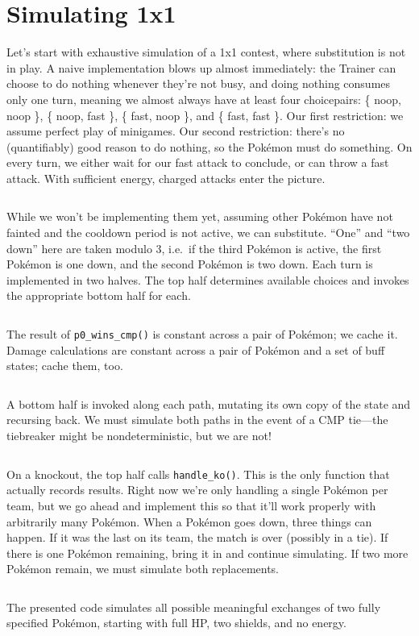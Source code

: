 \section{Simulating 1x1\label{sec:simul1x1}}
Let's start with exhaustive simulation of a 1x1 contest,
 where substitution is not in play.
A naive implementation blows up almost immediately: the Trainer can choose to do nothing
 whenever they're not busy, and doing nothing consumes only one turn,
 meaning we almost always have at least four choicepairs:
 \{ noop, noop \}, \{ noop, fast \}, \{ fast, noop \}, and \{ fast, fast \}.
Our first restriction: we assume perfect play of minigames.
Our second restriction: there's no (quantifiably) good reason to do nothing,
 so the Pokémon must do something.
On every turn, we either wait for our fast attack to conclude, or can throw a fast attack.
With sufficient energy, charged attacks enter the picture.
\inputminted{cpp}{s/sift.h}
While we won't be implementing them yet, assuming other Pokémon have not
  fainted and the cooldown period is not active, we can substitute.
``One'' and ``two down'' here are taken modulo 3, i.e.\ if the third Pokémon is
  active, the first Pokémon is one down, and the second Pokémon is two down.
Each turn is implemented in two halves.
The top half determines available choices and invokes the appropriate bottom half for each.
\inputminted{cpp}{s/top.h}
The result of \texttt{p0\_wins\_cmp()} is constant across a pair of Pokémon; we cache it.
Damage calculations are constant across a pair of Pokémon and a set of buff states; cache them, too.
\inputminted{cpp}{s/in.h}
A bottom half is invoked along each path, mutating its own copy of the state and recursing back.
We must simulate both paths in the event of a CMP tie---the tiebreaker might be nondeterministic, but we are not!
\inputminted{cpp}{s/bottom.h}
On a knockout, the top half calls \texttt{handle\_ko()}.
This is the only function that actually records results.
Right now we're only handling a single Pokémon per team, but we go ahead and implement this so that it'll work properly
 with arbitrarily many Pokémon.
When a Pokémon goes down, three things can happen.
If it was the last on its team, the match is over (possibly in a tie).
If there is one Pokémon remaining, bring it in and continue simulating.
If two more Pokémon remain, we must simulate both replacements.
\inputminted{cpp}{s/ko.h}
The presented code simulates all possible meaningful exchanges of two fully specified Pokémon, starting
  with full HP, two shields, and no energy.



